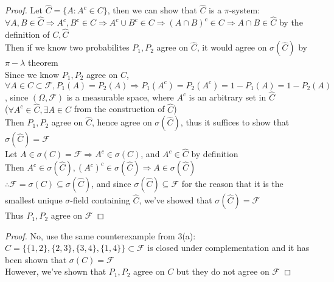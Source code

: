 \documentclass[12pt]{article}
\newenvironment{problem}[2][Problem]{\begin{trivlist}
\item[\hskip \labelsep {\bfseries #1}\hskip \labelsep {\bfseries #2.}]}{\end{trivlist}}
\begin{document}
\begin{problem}{3(b)}
\end{problem}
\begin{proof}
Let $\hat{C} = \{A: A^c\in C\}$, then we can show that $\hat{C}$ is a $\pi$-system:\\
$\forall A,B \in \hat{C} \Rightarrow A^c, B^c \in C \Rightarrow A^c \cup B^c \in C \Rightarrow (A\cap B)^c \in C \Rightarrow A\cap B \in \hat{C}$ by the definition of $C, \hat{C}$\\
Then if we know two probabilites $P_{1}, P_{2}$ agree on $\hat{C}$, it would agree on $\sigma(\hat{C})$ by $\pi - \lambda$ theorem\\
Since we know $P_{1}, P_{2}$ agree on ${C}$,\\
$\forall A \in C \subset \mathcal{F}, P_{1}(A) = P_{2}(A) \Rightarrow P_{1}(A^c) = P_{2}(A^c) = 1- P_{1}(A) = 1 - P_{2}(A)$, since $(\Omega, \mathcal{F})$ is a measurable space, where $A^c$ is an arbitrary set in $\hat{C}$\\
($\forall A^c \in \hat{C}, \exists A \in C$ from the construction of $\hat{C}$)\\
Then $P_{1}, P_{2}$ agree on $\hat{C}$, hence agree on $\sigma(\hat{C})$, thus it suffices to show that $\sigma(\hat{C}) = \mathcal{F}$\\
Let $A \in \sigma(C)=\mathcal{F} \Rightarrow A^c \in \sigma(C)$, and $A^c \in \hat{C}$ by definition\\
Then $A^c \in \sigma(\hat{C}), (A^c)^c \in \sigma(\hat{C}) \Rightarrow A \in \sigma(\hat{C})$\\
$\therefore \mathcal{F} = \sigma(C) \subseteq \sigma(\hat{C})$, and since $\sigma(\hat{C}) \subseteq \mathcal{F}$ for the reason that it is the smallest unique $\sigma$-field containing $\hat{C}$, we've showed that $\sigma(\hat{C}) = \mathcal{F}$\\
Thus $P_{1}, P_{2}$ agree on $\mathcal{F}$
\end{proof}


\begin{problem}{3(c)}
\end{problem}
\begin{proof}
No, use the same counterexample from 3(a):\\
$C = \{ \{1,2\}, \{2,3\}, \{3,4\}, \{1,4\} \} \subset \mathcal{F}$ is closed under complementation and it has been shown that $\sigma(C) = \mathcal{F}$\\
However, we've shown that $P_{1}, P_{2}$ agree on $C$ but they do not agree on $\mathcal{F}$
\end{proof}
\end{document}
